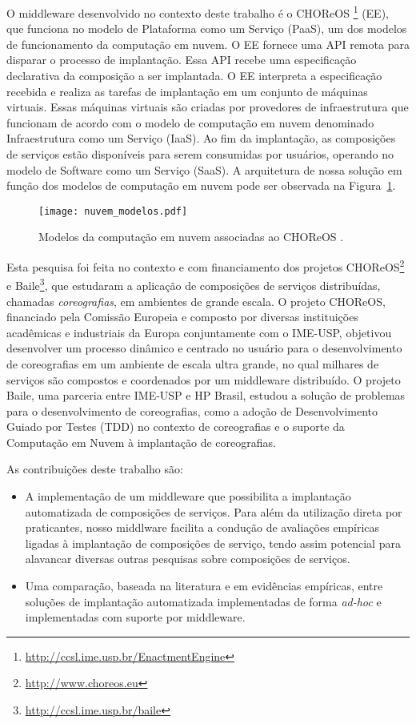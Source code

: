 O middleware desenvolvido no contexto deste trabalho é o CHOReOS \ee 
\footnote{\url{http://ccsl.ime.usp.br/EnactmentEngine}} (EE),
que funciona no modelo de Plataforma como um Serviço (PaaS), 
um dos modelos de funcionamento da computação em nuvem.
O EE fornece uma API remota para disparar o processo de implantação.
Essa API recebe uma especificação declarativa da composição a ser implantada.
O EE interpreta a especificação recebida e realiza as tarefas de implantação
em um conjunto de máquinas virtuais.
Essas máquinas virtuais são criadas por provedores de infraestrutura que funcionam
de acordo com o modelo de computação em nuvem denominado Infraestrutura como um Serviço (IaaS).
Ao fim da implantação, as composições de serviços estão disponíveis para serem consumidas
por usuários, operando no modelo de Software como um Serviço (SaaS).
A arquitetura de nossa solução em função dos modelos de computação em nuvem pode ser observada na Figura~\ref{fig:modelos_nuvem}.

\begin{figure}[!h]
  \centering
  \texttt{[image: nuvem\_modelos.pdf]} 
  \caption{Modelos da computação em nuvem associadas ao CHOReOS \ee.}
  \label{fig:modelos_nuvem} 
\end{figure}

Esta pesquisa foi feita no contexto e com financiamento dos projetos CHOReOS\footnote{\url{http://www.choreos.eu}} e Baile\footnote{\url{http://ccsl.ime.usp.br/baile}}, que estudaram a aplicação de composições de serviços distribuídas, chamadas \emph{coreografias}, em ambientes de grande escala. O projeto CHOReOS, financiado pela Comissão Europeia e composto por diversas instituições acadêmicas e industriais da Europa conjuntamente com o IME-USP, objetivou desenvolver um processo dinâmico e centrado no usuário para o desenvolvimento de coreografias em um ambiente de escala ultra grande, no qual milhares de serviços são compostos e coordenados por um middleware distribuído. O projeto Baile, uma parceria entre IME-USP e HP Brasil, estudou a solução de problemas para o desenvolvimento de coreografias, como a adoção de Desenvolvimento Guiado por Testes (TDD) no contexto de coreografias e o suporte da Computação em Nuvem à implantação de coreografias.

As contribuições deste trabalho são: 

\begin{itemize}
\item A implementação de um middleware que possibilita a implantação automatizada de composições de serviços. Para além da utilização direta por praticantes, nosso middlware facilita a condução de
avaliações empíricas ligadas à implantação de composições de serviço, tendo assim potencial para alavancar diversas outras pesquisas sobre composições de serviços.
\item Uma comparação, baseada na literatura e em evidências empíricas, entre soluções de implantação automatizada implementadas de forma \emph{ad-hoc} e implementadas com suporte por middleware.
\end{itemize}

